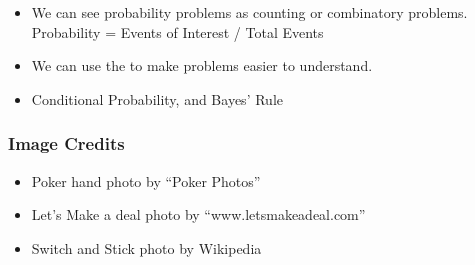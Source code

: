 \documentclass{beamer}
\begin{document}
\begin{frame}

  {\large
    \begin{itemize}
    \item We can see probability problems as counting or combinatory problems.\\
      \alert{Probability = Events of Interest / Total Events}
      
      \bigskip

    \item We can use the  to make problems easier to understand.
      \bigskip

    \item Conditional Probability, and Bayes' Rule
    \end{itemize}
  }
\end{frame}





\begin{frame}
  \frametitle{Image Credits}
  \begin{itemize}
  \item Poker hand photo by ``Poker Photos''
  \item Let's Make a deal photo by ``www.letsmakeadeal.com''
  \item Switch and Stick photo by Wikipedia
  \end{itemize}
\end{frame}
\end{document}
